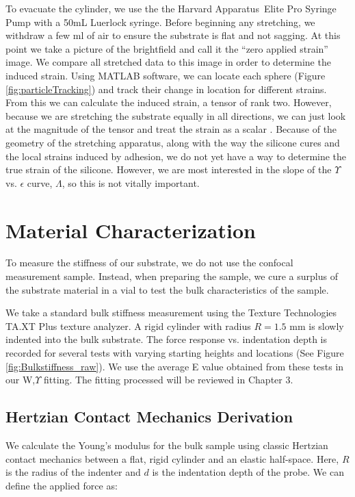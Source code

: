 To evacuate the cylinder, we use the the Harvard Apparatus\texttrademark \ Elite Pro Syringe Pump with a 50mL Luerlock syringe. Before beginning any stretching, we withdraw a few ml of air to ensure the substrate is flat and not sagging. At this point we take a picture of the brightfield and call it the ``zero applied strain'' image. We compare all stretched data to this image in order to determine the induced strain. Using MATLAB software, we can locate each sphere (Figure \ref{fig:particleTracking}) and track their change in location for different strains. From this we can calculate the induced strain, a tensor of rank two. However, because we are stretching the substrate equally in all directions, we can just look at the magnitude of the tensor and treat the strain as a scalar \cite{xu2017direct,xu2018surface}. Because of the geometry of the stretching apparatus, along with the way the silicone cures and the local strains induced by adhesion, we do not yet have a way to determine the true strain of the silicone. However, we are most interested in the slope of the $\Upsilon$ vs. $\epsilon$ curve, $\Lambda$, so this is not vitally important.
   

\section{Material Characterization}
To measure the stiffness of our substrate, we do not use the confocal measurement sample. Instead, when preparing the sample, we cure a surplus of the substrate material in a vial to test the bulk characteristics of the sample. 

We take a standard bulk stiffness measurement using the Texture Technologies TA.XT Plus texture analyzer. A rigid cylinder with radius $R = 1.5$ mm is slowly indented into the bulk substrate. The force response vs. indentation depth is recorded for several tests with varying starting heights and locations (See Figure \ref{fig:Bulkstiffness_raw}). We use the average E value obtained from these tests in our W,$ \Upsilon $ fitting. The fitting processed will be reviewed in Chapter 3. 


\subsection{Hertzian Contact Mechanics Derivation}
We calculate the Young's modulus for the bulk sample using classic Hertzian contact mechanics between a flat, rigid cylinder and an elastic half-space. Here, $ R $ is the radius of the indenter and $ d $ is the indentation depth of the probe. We can define the applied force as:

